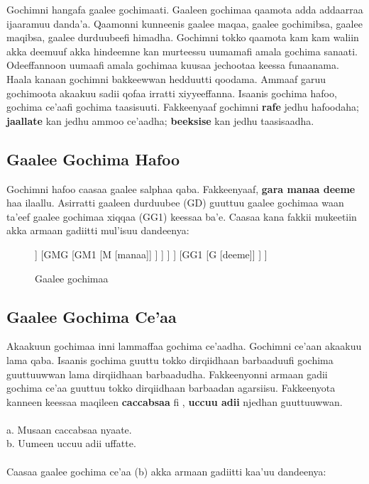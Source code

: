 \documentclass[11pt,b5paper]{book}
\begin{document}
Gochimni hangafa gaalee gochimaati. Gaaleen gochimaa qaamota adda addaarraa ijaaramuu danda’a. Qaamonni
kunneenis gaalee maqaa, gaalee gochimibsa, gaalee maqibsa, gaalee durduubeefi himadha. Gochimni tokko qaamota kam
kam waliin akka deemuuf akka hindeemne kan murteessu uumamafi amala gochima sanaati. Odeeffannoon uumaafi
amala gochimaa kuusaa jechootaa keessa funaanama. Haala kanaan gochimni bakkeewwan hedduutti qoodama. Ammaaf
garuu gochimoota akaakuu sadii qofaa irratti xiyyeeffanna. Isaanis gochima hafoo, gochima ce'aafi gochima taasisuuti. Fakkeenyaaf gochimni \textbf{rafe} jedhu hafoodaha; \textbf{jaallate} kan jedhu ammoo ce'aadha; \textbf{beeksise} kan jedhu taasisaadha. 

\subsection{Gaalee Gochima Hafoo}
Gochimni hafoo caasaa gaalee salphaa qaba. Fakkeenyaaf, \textbf{ gara manaa deeme} haa ilaallu. Asirratti
gaaleen durduubee (GD) guuttuu gaalee gochimaa waan ta’eef gaalee gochimaa xiqqaa (GG1) keessaa ba’e. Caasaa kana fakkii mukeetiin akka armaan gadiitti mul’isuu dandeenya: 

 \begin{figure}[H]										
	\caption{Gaalee gochimaa}
	\centering
	\begin{forest}
		[GGG
			[GDG
				[GD1
					[D [gara]]
					[GMG
						[GM1
							[M [manaa]]
						]
					]
				]
			]
			[GG1
				[G [deeme]]
			]
		]
	\end{forest}
\end{figure}

\subsection{Gaalee Gochima Ce'aa}
Akaakuun gochimaa inni lammaffaa gochima ce'aadha. Gochimni ce'aan akaakuu lama qaba. Isaanis gochima guuttu
tokko dirqiidhaan barbaaduufi gochima guuttuuwwan lama dirqiidhaan barbaadudha. Fakkeenyonni armaan gadii gochima
ce'aa guuttuu tokko dirqiidhaan barbaadan agarsiisu. Fakkeenyota kanneen keessaa maqileen \textbf{caccabsaa} fi , \textbf{uccuu adii }njedhan guuttuuwwan. \\
\\
a. Musaan caccabsaa nyaate.\\
b. Uumeen uccuu adii uffatte.\\
\\
Caasaa gaalee gochima ce'aa (b) akka armaan gadiitti kaa'uu dandeenya: 
\end{document}
